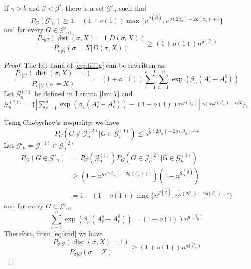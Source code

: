 \documentclass[entropy,article,submit,moreauthors,pdftex]{Definitions/mdpi}
\newcommand{\cG}{\mathcal{G}}
\newcommand{\1}{\mathbbm{1}}
\DeclareMathOperator{\Dist}{dist}
\begin{document}
\begin{Lemma}\label{prop:large2}
	If $\gamma > b$ and $\beta < \beta^*$, there is a set $\cG'_n$ such that
	\begin{equation}
	P_G(\cG'_n) \geq 1 - (1+o(1))\max\{n^{g(\bar{\beta})}, n^{\tilde{g}(2\beta_n) - 2g(\beta_n) + \epsilon} \}
	\end{equation}
	and for every $G \in \cG'_n$,
	\begin{equation}\label{eq:diff1g}
	\frac{P_{\sigma|G}(\Dist(\sigma, X)=1 | D(\sigma, X))}
	{P_{\sigma|G}(\sigma=X | D(\sigma, X))} \geq (1+o(1))n^{g(\beta_n)}
	\end{equation}
	
\end{Lemma}
\begin{proof}
The left hand of \eqref{eq:diff1g} can be rewritten as:
\begin{equation}\label{eq:knd}
	\frac{P_{\sigma|G}(\Dist(\sigma, X)=1)}
{P_{\sigma|G}(\sigma=X)}= (1+o(1))\sum_{s=1}^{k-1}\sum_{r=1}^n \exp(\beta_n (A_r^s - A_r^0))
\end{equation}
Let $\cG^{(1)}_n$ be defined in Lemma \ref{lem:7}
and $\cG^{(2)}_n: = \{|\sum_{r=1}^n \exp(\beta_n (A_r^s - A_r^0)) - (1+o(1))n^{g(\beta_n)}  | \leq n^{g(\beta_n) - \epsilon / 2} \}$,

Using Chebyshev's inequality, we have
\begin{equation*}
P_G(G \not\in \cG^{(2)}_n \Big\vert  G \in \cG^{(1)}_n) \leq n^{\tilde{g}(2\beta_n) - 2g(\beta_n) + \epsilon}
\end{equation*}
Let $\cG'_n = \cG^{(1)}_n \cap \cG^{(2)}_n$
\begin{align*}
P_G(G \in \cG'_n) &= P_G(\cG^{(1)}_n) P_G(G \in \cG_n^{(2)} | G \in \cG_n^{(1)}) \\
& \geq (1-n^{\tilde{g}(2\beta_n) - 2g(\beta_n) + \epsilon})(1-n^{g(\bar{\beta})}) \\
&= 1-(1+o(1))\max\{n^{g(\bar{\beta})}, n^{\tilde{g}(2\beta_n) - 2g(\beta_n) + \epsilon} \}
\end{align*}
and for every $G\in\cG'_n$,
\begin{equation*}
\sum_{r=1}^n \exp(\beta_n (A_r^s - A_r^0)) = (1+o(1)) n^{g(\beta_n)}
\end{equation*}
Therefore, from \eqref{eq:knd} we have
\begin{equation*}
	\frac{P_{\sigma|G}(\Dist(\sigma, X)=1)}
{P_{\sigma|G}(\sigma=X)} \geq (1+o(1)) n^{g(\beta_n)}
\end{equation*}
\end{proof}
\end{document}
